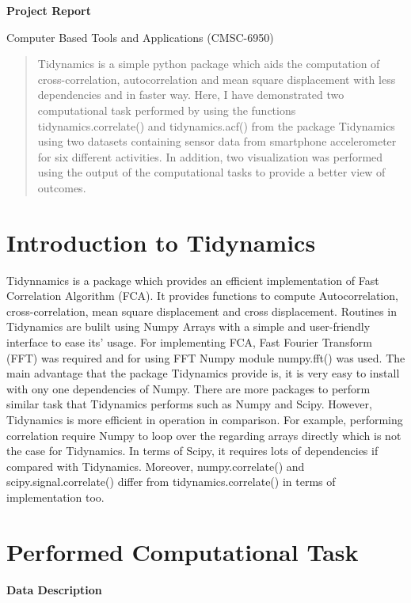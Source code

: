 \documentclass{article}
\begin{document}
   \begin{center}
       \vspace*{1cm}

       \textbf{Project Report}

       \vspace{0.5cm}
        Computer Based Tools and Applications (CMSC-6950)
   \end{center}
\begin{abstract}
Tidynamics is a simple python package which aids the computation of cross-correlation, autocorrelation and mean square displacement with less dependencies and in faster way. Here, I have demonstrated two computational task performed by using the functions tidynamics.correlate() and tidynamics.acf() from the package Tidynamics  using two datasets containing sensor data from smartphone accelerometer for six different activities. In addition, two visualization was performed using the output of the computational tasks to provide a better view of outcomes.
\end{abstract}

\section{Introduction to Tidynamics}

Tidynnamics is a package which provides an efficient implementation of Fast Correlation Algorithm (FCA). It provides functions to compute Autocorrelation, cross-correlation, mean square displacement and cross displacement. Routines in Tidynamics are bulilt using Numpy Arrays with a simple and user-friendly interface to ease its’ usage. For implementing FCA, Fast Fourier Transform (FFT) was required and for using FFT Numpy module numpy.fft() was used. 
The main advantage that the package Tidynamics provide is, it is very easy to install with ony one dependencies of Numpy. There are more packages to perform similar task that Tidynamics performs such as Numpy and Scipy. However, Tidynamics is more efficient in operation in comparison. For example, performing correlation require Numpy to loop over the regarding arrays directly which is not the case for Tidynamics. In terms of Scipy, it requires lots of dependencies if compared with Tidynamics. Moreover, numpy.correlate() and scipy.signal.correlate() differ from tidynamics.correlate() in terms of implementation too. 

\section{Performed Computational Task}
\textbf{Data Description}
\end{document}

